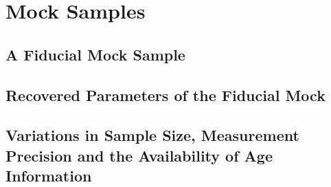 \documentclass[ms.tex]{subfiles}
\begin{document}
\section{Mock Samples}
\label{sec:mocks}

\subsection{A Fiducial Mock Sample}
\label{sec:mocks:fiducial}

\subsection{Recovered Parameters of the Fiducial Mock}
\label{sec:mocks:recovered}

\subsection{Variations in Sample Size, Measurement Precision and the
Availability of Age Information}
\label{sec:mocks:variations}
\end{document}
